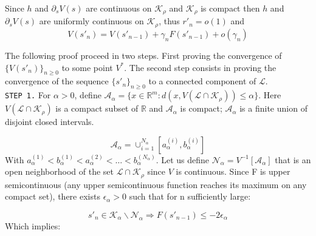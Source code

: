 \documentclass[a4paper]{article}
\theoremstyle{plain}
\theoremstyle{plain}
\theoremstyle{definition}
\begin{document}
\begin{appendices}
{Since $h$ and $\partial_s V(s)$ are continuous on $\mathcal{K}_{\rho}$ and $\mathcal{K}_{\rho}$ is compact then $h$ and $\partial_s V(s)$ are uniformly continuous on $\mathcal{K}_{\rho}$, thus $r'_n = o(1)$ and 
\begin{equation}
V(s'_n) = V(s'_{n-1}) + \gamma_n F(s'_{n-1}) + o(\gamma_n)
\end{equation}

The following proof proceed in two steps. First proving the convergence of $\{V(s'_n)\}_{n \geq 0}$ to some point $V^*$. The second step consists in proving the convergence of the sequence $\{s'_n\}_{n \geq 0}$ to a connected component of $\mathcal{L}$.\\

\noindent \texttt{STEP 1.} For $\alpha > 0$, define $\mathcal{A}_{\alpha} = \{x \in \mathbb{R}^m: d(x,V(\mathcal{L} \cap \mathcal{K}_{\rho})) \leq \alpha\}$. Here $V(\mathcal{L} \cap \mathcal{K}_{\rho})$ is a compact subset of $\mathbb{R}$ and $\mathcal{A}_{\alpha}$ is compact; $\mathcal{A}_{\alpha}$ is a finite union of disjoint closed intervals.

\begin{equation}
\mathcal{A}_{\alpha} = \cup_{i=1}^{N_{\alpha}}[a_{\alpha}^{(i)}, b_{\alpha}^{(i)}]
\end{equation}
With $a_{\alpha}^{(1)} < b_{\alpha}^{(1)} < a_{\alpha}^{(2)} < \dots < b_{\alpha}^{(N_{\alpha})}$. Let us define $\mathcal{N}_{\alpha} = V^{-1}[\mathcal{A}_{\alpha}]$ that is an open neighborhood of the set $\mathcal{L} \cap \mathcal{K}_{\rho}$ since $V$ is continuous. Since F is upper semicontinuous (any upper semicontinuous function reaches its maximum on any compact set), there exists $\epsilon_{\alpha} > 0$ such that for n sufficiently large:

\begin{equation}
s'_n \in \mathcal{K}_{\alpha} \backslash \mathcal{N}_{\alpha} \Rightarrow F(s'_{n-1}) \leq -2 \epsilon_{\alpha}
\end{equation}
Which implies:

}
\end{appendices}
\end{document}
